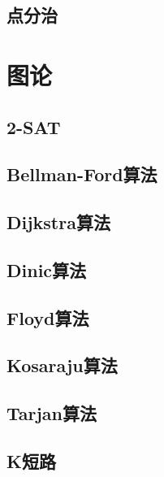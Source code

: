 \documentclass[twocolumn,a4]{article}  %
\begin{document}
		\subsection{点分治}
			
	 	 	
	\section{图论}
		\subsection{2-SAT}
	 	 	

		\subsection{Bellman-Ford算法}
	 	 	
	 	 	
		\subsection{Dijkstra算法}
	 	 	
	 	 	
		\subsection{Dinic算法}
	 	 	
	 	 	
		\subsection{Floyd算法}
	 	 	
	 	 	
		\subsection{Kosaraju算法}
	 	 	
	 	 	
	 	\subsection{Tarjan算法}
	 	 	
	 	 	
		\subsection{K短路}
	 	 	
	 	 	
\end{document}
